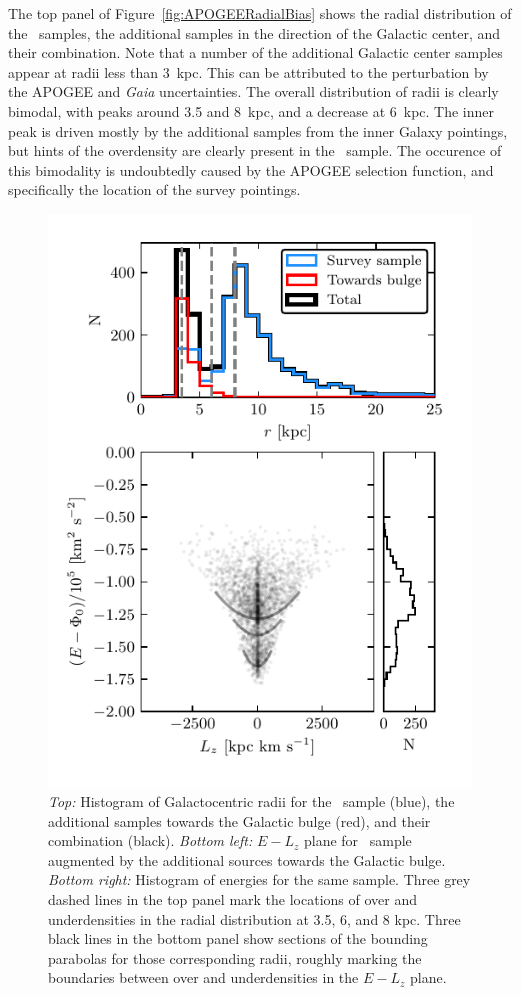 The top panel of Figure~\ref{fig:APOGEERadialBias} shows the radial distribution of the \survey\ samples, the additional samples in the direction of the Galactic center, and their combination. Note that a number of the additional Galactic center samples appear at radii less than 3~kpc. This can be attributed to the perturbation by the APOGEE and \textit{Gaia} uncertainties. The overall distribution of radii is clearly bimodal, with peaks around 3.5 and 8~kpc, and a decrease at 6~kpc. The inner peak is driven mostly by the additional samples from the inner Galaxy pointings, but hints of the overdensity are clearly present in the \survey\ sample. The occurence of this bimodality is undoubtedly caused by the APOGEE selection function, and specifically the location of the survey pointings.

\begin{figure}
    \centering
    \includegraphics[width=\halftextwidth]{figure/ch2/APOGEEHaloRadialBias.pdf}
    \caption{\textit{Top:} Histogram of Galactocentric radii for the \survey\ sample (blue), the additional samples towards the Galactic bulge (red), and their combination (black). \textit{Bottom left:} $E-L_{z}$ plane for \survey\ sample augmented by the additional sources towards the Galactic bulge. \textit{Bottom right:} Histogram of energies for the same sample. Three grey dashed lines in the top panel mark the locations of over and underdensities in the radial distribution at 3.5, 6, and 8 kpc. Three black lines in the bottom panel show sections of the bounding parabolas for those corresponding radii, roughly marking the boundaries between over and underdensities in the $E-L_{z}$ plane.}

\end{figure}
